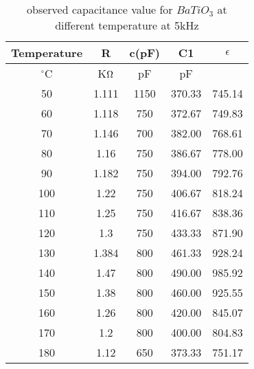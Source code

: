 \begin{table}[H]
    \centering
    \begin{tabular}{|c|c|c|c|c|}
        \hline
        Temperature & R       & c(pF) & C1     & $\epsilon$ \\ \hline
        $^{\circ}$C & K$\ohm$ & pF    & pF     & ~          \\ \hline
        50          & 1.111   & 1150  & 370.33 & 745.14     \\ \hline
        60          & 1.118   & 750   & 372.67 & 749.83     \\ \hline
        70          & 1.146   & 700   & 382.00 & 768.61     \\ \hline
        80          & 1.16    & 750   & 386.67 & 778.00     \\ \hline
        90          & 1.182   & 750   & 394.00 & 792.76     \\ \hline
        100         & 1.22    & 750   & 406.67 & 818.24     \\ \hline
        110         & 1.25    & 750   & 416.67 & 838.36     \\ \hline
        120         & 1.3     & 750   & 433.33 & 871.90     \\ \hline
        130         & 1.384   & 800   & 461.33 & 928.24     \\ \hline
        140         & 1.47    & 800   & 490.00 & 985.92     \\ \hline
        150         & 1.38    & 800   & 460.00 & 925.55     \\ \hline
        160         & 1.26    & 800   & 420.00 & 845.07     \\ \hline
        170         & 1.2     & 800   & 400.00 & 804.83     \\ \hline
        180         & 1.12    & 650   & 373.33 & 751.17     \\ \hline
    \end{tabular}
    \caption{observed capacitance value for $BaTiO_3$ at different temperature at 5kHz}
    \label{tab:4}
\end{table}